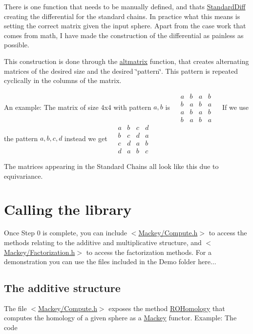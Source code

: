 \begin{DoxyItemize}
\item There is one function that needs to be manually defined, and that\textquotesingle{}s \hyperlink{classGroupSpecific_1_1Function_a8ead55e2f2e2bbda4deea3964793498d}{Standard\+Diff} creating the differential for the standard chains. In practice what this means is setting the correct matrix given the input sphere. Apart from the case work that comes from math, I have made the construction of the differential as painless as possible.
\item This construction is done through the \hyperlink{namespaceMackey_a26a529f63caac9c5b4dc809e0e5831be}{altmatrix} function, that creates alternating matrices of the desired size and the desired \char`\"{}pattern\char`\"{}. This pattern is repeated cyclically in the columns of the matrix.
\item An example\+: The matrix of size 4x4 with pattern $a,b$ is ~\newline
 $\begin{matrix} a&b&a&b\\ b&a&b&a\\ a&b&a&b \\ b&a&b&a \end{matrix}$ ~\newline
 If we use the pattern $a,b,c,d$ instead we get ~\newline
 $\begin{matrix} a&b&c&d\\ b&c&d&a\\ c&d&a&b \\ d&a&b&c \end{matrix}$ ~\newline

\item The matrices appearing in the Standard Chains all look like this due to equivariance.
\end{DoxyItemize}\hypertarget{use_next}{}\section{Calling the library}\label{use_next}
Once Step 0 is complete, you can include {\ttfamily $<$\hyperlink{Compute_8h}{Mackey/\+Compute.\+h}$>$} to access the methods relating to the additive and multiplicative structure, and {\ttfamily $<$\hyperlink{Factorization_8h}{Mackey/\+Factorization.\+h}$>$} to access the factorization methods. For a demonstration you can use the files included in the Demo folder here...\hypertarget{use_step1add}{}\subsection{The additive structure}\label{use_step1add}
The file {\ttfamily $<$\hyperlink{Compute_8h}{Mackey/\+Compute.\+h}$>$} exposes the method \hyperlink{namespaceMackey_a58708ee937b0c4172b7cde8e5f856504}{R\+O\+Homology} that computes the homology of a given sphere as a \hyperlink{namespaceMackey}{Mackey} functor. Example\+: The code

